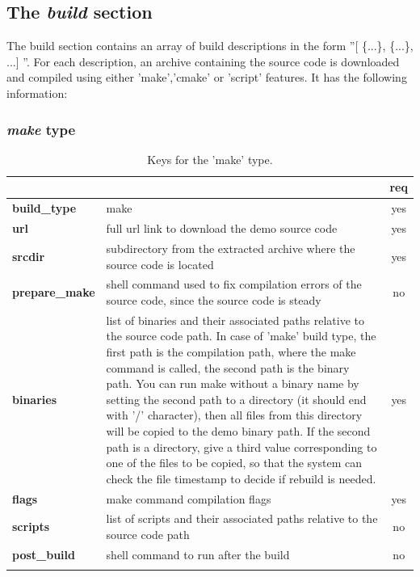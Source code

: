 \subsection{The \emph{build} section}

The build section contains an array of build descriptions in the form
''[ \{...\}, \{...\}, ...] ''. For each description, an archive containing the 
source code is downloaded and compiled using either 'make','cmake' or 'script' features.
It has the following information:

\subsubsection{\emph{make} type}

\begin{longtable}{|>{\bf}L{\linewidth}|L{\linewidth}|c|}
\hline
{}     &  & {\bf req} \tabularnewline 
\hline \hline
 build\_type    & make & yes \\ \hline
 url        & full url link to download the demo source code & yes \\ \hline
 srcdir     & subdirectory from the extracted archive where the source code is 
            located & yes \\ \hline
 prepare\_make & shell command used to fix compilation errors of the source code,
                since the source code is steady & no  \\ \hline
 binaries   & list of binaries and their associated paths relative to the source 
            code path. In case of 'make' build type, the first path is the compilation
            path, where the make command is called, the second path is the binary
            path. You can run make without a binary name by setting the second
            path to a directory (it should end with '/' character), then all files 
            from this directory will be copied
            to the demo binary path. If the second path is a directory, give 
            a third value corresponding to one of the files to be copied, so that
            the system can check the file timestamp to decide if rebuild is needed.
            & yes \\ \hline
 flags      & make command compilation flags & yes \\ \hline
 scripts    & list of scripts and their associated paths relative to the source 
            code path & no  \\ \hline
 post\_build & shell command to run after the build & no \\ \hline
\caption{Keys for the 'make' type.}
\end{longtable}

